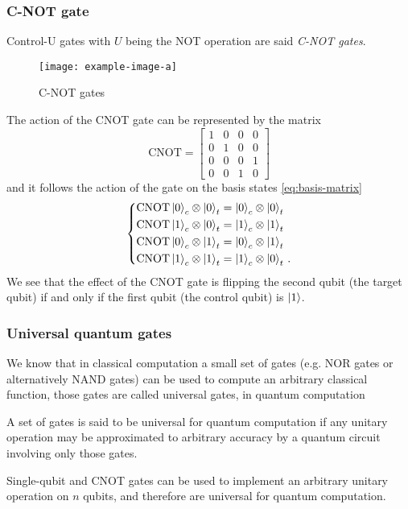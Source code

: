 \subsubsection{C-NOT gate}
Control-U gates with $U$ being the NOT operation are said \emph{C-NOT gates}.
\begin{figure}[htb]
\centering
\texttt{[image: example-image-a]}
\caption{C-NOT gates}
\label{fig:controlled-note}
\end{figure}
The action of the CNOT gate can be represented by the matrix
\begin{equation*}
      \text{CNOT} =  \begin{bmatrix}
    1 & 0 & 0 & 0\\
    0 & 1 & 0 & 0 \\
    0 & 0 & 0 & 1 \\
    0 & 0 & 1 & 0
    \end{bmatrix} 
\end{equation*}
and it follows the action of the gate on the basis states \eqref{eq:basis-matrix}
\begin{equation*}
\left\{
\begin{aligned}
&\text{CNOT} \ket{0}_c \otimes \ket{0}_t = \ket{0}_c \otimes \ket{0}_t \\
&\text{CNOT} \ket{1}_c \otimes \ket{0}_t = \ket{1}_c \otimes \ket{1}_t \\
&\text{CNOT} \ket{0}_c \otimes \ket{1}_t = \ket{0}_c \otimes \ket{1}_t \\
&\text{CNOT} \ket{1}_c \otimes \ket{1}_t = \ket{1}_c \otimes \ket{0}_t\,.
\end{aligned}
\right.
\end{equation*}
We see that the effect of the CNOT gate is flipping the second qubit (the target qubit) if and only if the first qubit (the control qubit) is $\ket{1}$.
\subsubsection{Universal quantum gates}
We know that in classical computation a small set of gates (e.g. NOR gates or alternatively NAND gates) can be used to compute an arbitrary classical function, those gates are called universal gates, in quantum computation
\begin{defn}
A set of gates is said to be universal for quantum computation if any unitary operation may be approximated to arbitrary accuracy by a quantum circuit involving only those gates.
\end{defn}
\begin{theorem}
Single-qubit and CNOT gates can be used to implement an arbitrary unitary operation on $n$ qubits,
and therefore are universal for quantum computation. \cite[191]{NielsenChuang}
\end{theorem}

